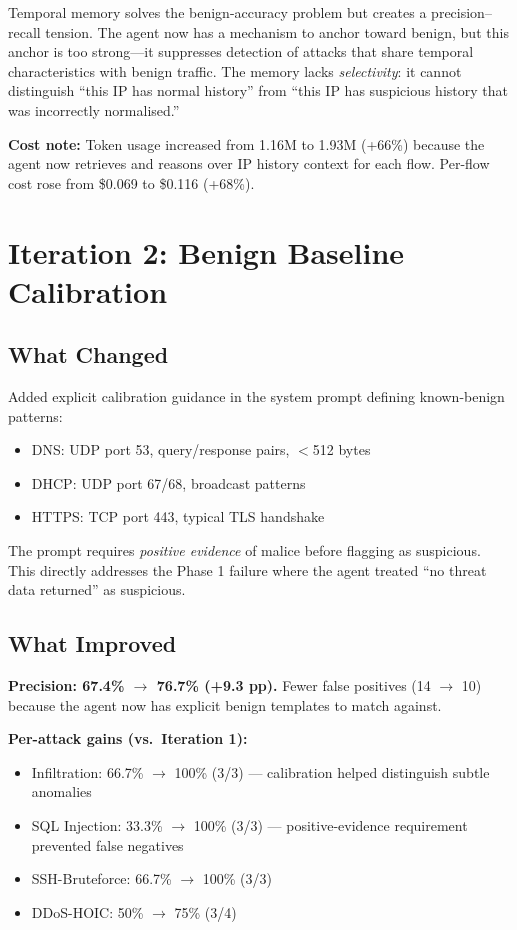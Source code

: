 \documentclass[12pt, a4paper, oneside]{report}
\begin{document}
Temporal memory solves the benign-accuracy problem but creates a precision--recall
tension. The agent now has a mechanism to anchor toward benign, but this anchor
is too strong---it suppresses detection of attacks that share temporal
characteristics with benign traffic. The memory lacks \emph{selectivity}: it
cannot distinguish ``this IP has normal history'' from ``this IP has suspicious
history that was incorrectly normalised.''

\textbf{Cost note:} Token usage increased from 1.16M to 1.93M (+66\%) because
the agent now retrieves and reasons over IP history context for each flow.
Per-flow cost rose from \$0.069 to \$0.116 (+68\%).


\section{Iteration 2: Benign Baseline Calibration}
\label{sec:iter2}

\subsection{What Changed}

Added explicit calibration guidance in the system prompt defining known-benign
patterns:
\begin{itemize}
  \item DNS: UDP port 53, query/response pairs, $<$512 bytes
  \item DHCP: UDP port 67/68, broadcast patterns
  \item HTTPS: TCP port 443, typical TLS handshake
\end{itemize}

The prompt requires \emph{positive evidence} of malice before flagging as
suspicious. This directly addresses the Phase 1 failure where the agent treated
``no threat data returned'' as suspicious.

\subsection{What Improved}

\textbf{Precision: 67.4\% $\rightarrow$ 76.7\% (+9.3 pp).}
Fewer false positives (14 $\rightarrow$ 10) because the agent now has explicit
benign templates to match against.

\textbf{Per-attack gains (vs.\ Iteration 1):}
\begin{itemize}
  \item Infiltration: 66.7\% $\rightarrow$ 100\% (3/3) --- calibration helped
        distinguish subtle anomalies
  \item SQL Injection: 33.3\% $\rightarrow$ 100\% (3/3) --- positive-evidence
        requirement prevented false negatives
  \item SSH-Bruteforce: 66.7\% $\rightarrow$ 100\% (3/3)
  \item DDoS-HOIC: 50\% $\rightarrow$ 75\% (3/4)
\end{itemize}
\end{document}
